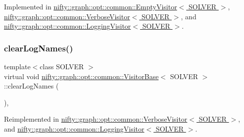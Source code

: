 Implemented in \hyperlink{classnifty_1_1graph_1_1opt_1_1common_1_1EmptyVisitor_a5f9827674a0f59ada6b10a468efe85e8}{nifty\+::graph\+::opt\+::common\+::\+Empty\+Visitor$<$ S\+O\+L\+V\+E\+R $>$}, \hyperlink{classnifty_1_1graph_1_1opt_1_1common_1_1VerboseVisitor_a94bdc19115ed1cedceb2811654983293}{nifty\+::graph\+::opt\+::common\+::\+Verbose\+Visitor$<$ S\+O\+L\+V\+E\+R $>$}, and \hyperlink{classnifty_1_1graph_1_1opt_1_1common_1_1LoggingVisitor_a5ab79ee5e4afe5e7af570c64b1678dbc}{nifty\+::graph\+::opt\+::common\+::\+Logging\+Visitor$<$ S\+O\+L\+V\+E\+R $>$}.

\mbox{\label{classnifty_1_1graph_1_1opt_1_1common_1_1VisitorBase_a9ac54577b1a0378834ffe2029a321744}} 
\subsubsection{\texorpdfstring{clear\+Log\+Names()}{clearLogNames()}}
{\footnotesize\ttfamily template$<$class S\+O\+L\+V\+ER $>$ \\
virtual void \hyperlink{classnifty_1_1graph_1_1opt_1_1common_1_1VisitorBase}{nifty\+::graph\+::opt\+::common\+::\+Visitor\+Base}$<$ S\+O\+L\+V\+ER $>$\+::clear\+Log\+Names (\begin{DoxyParamCaption}{ }\end{DoxyParamCaption})\hspace{0.3cm}{\ttfamily [inline]}, {\ttfamily [virtual]}}



Reimplemented in \hyperlink{classnifty_1_1graph_1_1opt_1_1common_1_1VerboseVisitor_a0df0016f1f72819de000a57538426969}{nifty\+::graph\+::opt\+::common\+::\+Verbose\+Visitor$<$ S\+O\+L\+V\+E\+R $>$}, and \hyperlink{classnifty_1_1graph_1_1opt_1_1common_1_1LoggingVisitor_a84dd33facd4e7b509e5d311f2e94df1a}{nifty\+::graph\+::opt\+::common\+::\+Logging\+Visitor$<$ S\+O\+L\+V\+E\+R $>$}.

\mbox{\label{classnifty_1_1graph_1_1opt_1_1common_1_1VisitorBase_aab59ead6ecef2fcaf3da5a96d0ec4c51}} 
